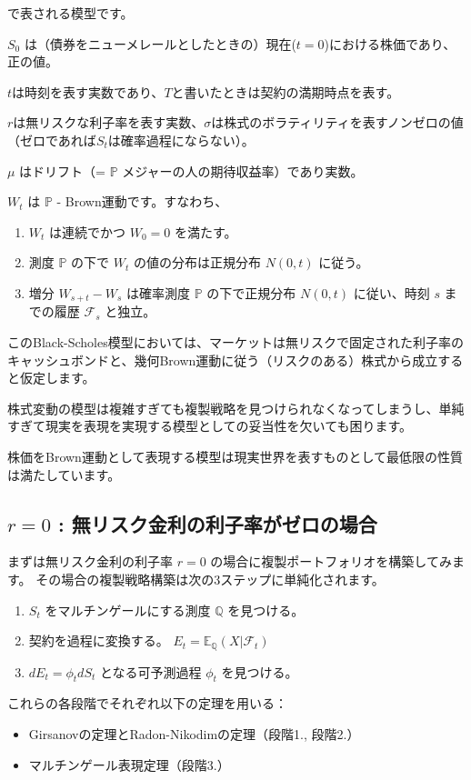 \documentclass[uplatex,a4j,12pt,dvipdfmx]{jsarticle}
\begin{document}
で表される模型です。

$S_{0}$ は（債券をニューメレールとしたときの）現在($t=0$)における株価であり、正の値。

$t$は時刻を表す実数であり、$T$と書いたときは契約の満期時点を表す。

$r$は無リスクな利子率を表す実数、$\sigma$は株式のボラティリティを表すノンゼロの値（ゼロであれば$S_{t}$は確率過程にならない）。

$\mu$ はドリフト（= $\mathbb{P}$ メジャーの人の期待収益率）であり実数。

$W_{t}$ は $\mathbb{P}$ - Brown運動です。すなわち、
\begin{enumerate}
	\item $W_{t}$ は連続でかつ $W_{0} = 0$ を満たす。
	\item 測度 $\mathbb{P}$ の下で $W_{t}$ の値の分布は正規分布 $N(0,t)$ に従う。
	\item 増分 $W_{s+t} - W_{s}$ は確率測度 $\mathbb{P}$ の下で正規分布 $N(0,t)$ に従い、時刻 $s$ までの履歴 $\mathcal{F}_{s}$ と独立。
\end{enumerate}

このBlack-Scholes模型においては、マーケットは無リスクで固定された利子率のキャッシュボンドと、幾何Brown運動に従う（リスクのある）株式から成立すると仮定します。

株式変動の模型は複雑すぎても複製戦略を見つけられなくなってしまうし、単純すぎて現実を表現を実現する模型としての妥当性を欠いても困ります。

株価をBrown運動として表現する模型は現実世界を表すものとして最低限の性質は満たしています。

\subsection{$r=0$ : 無リスク金利の利子率がゼロの場合}
まずは無リスク金利の利子率 $r=0$ の場合に複製ポートフォリオを構築してみます。
その場合の複製戦略構築は次の3ステップに単純化されます。
\begin{enumerate}
	\item $S_{t}$ をマルチンゲールにする測度 $\mathbb{Q}$ を見つける。
	\item 契約を過程に変換する。 $E_{t} = \mathbb{E}_{\mathbb{Q}}( X | \mathcal{F}_{t})$
	\item $dE_{t} = \phi_{t} d S_{t}$ となる可予測過程 $\phi_{t}$ を見つける。
\end{enumerate}
これらの各段階でそれぞれ以下の定理を用いる：
\begin{itemize}
	\item Girsanovの定理とRadon-Nikodimの定理（段階1., 段階2.）
	\item マルチンゲール表現定理（段階3.）
\end{itemize}
\end{document}
